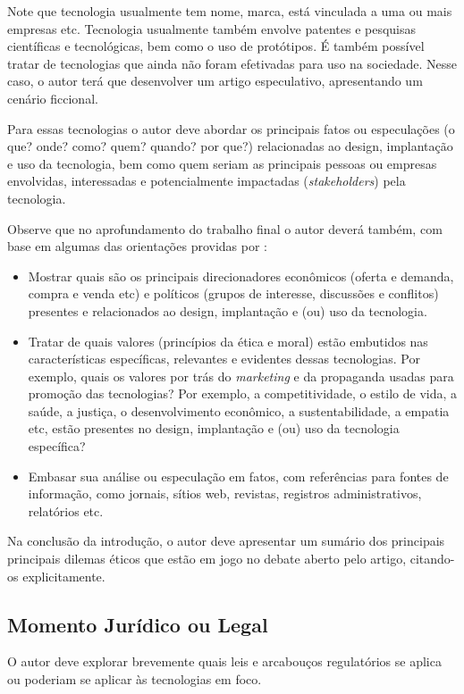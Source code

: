 \documentclass[12pt]{article}
\begin{document}
	Note que tecnologia usualmente tem nome, marca, está vinculada a uma ou mais empresas etc. Tecnologia usualmente também envolve patentes e pesquisas científicas e tecnológicas, bem como o uso de protótipos. É também possível tratar de tecnologias que ainda não foram efetivadas para uso na sociedade. Nesse caso, o autor terá que desenvolver um artigo especulativo, apresentando um cenário ficcional.

	Para essas tecnologias o autor deve abordar os principais fatos ou especulações (o que? onde? como? quem? quando? por que?) relacionadas ao design, implantação e uso da tecnologia, bem como quem seriam as principais pessoas ou empresas envolvidas, interessadas e potencialmente impactadas (\textit{stakeholders}) pela tecnologia.

	Observe que no aprofundamento do trabalho final o autor deverá também, com base em algumas das orientações providas por \citet{jones_doing_2016}:
	\begin{itemize}
		\item  Mostrar quais são os principais direcionadores econômicos (oferta e demanda, compra e venda etc) e políticos (grupos de interesse, discussões e conflitos) presentes e relacionados ao design, implantação e (ou) uso da tecnologia.

		\item  Tratar de quais valores (princípios da ética e moral) estão embutidos nas características específicas, relevantes e evidentes dessas tecnologias. Por exemplo, quais os valores por trás do \textit{marketing} e da propaganda usadas para promoção das tecnologias? Por exemplo, a competitividade, o estilo de vida, a saúde, a justiça, o desenvolvimento econômico, a sustentabilidade, a empatia etc, estão presentes no design, implantação e (ou) uso da tecnologia específica?

		\item  Embasar sua análise ou especulação em fatos, com referências para fontes de informação, como jornais, sítios web, revistas, registros administrativos, relatórios etc.
	\end{itemize}

	Na conclusão da introdução, o autor deve apresentar um sumário dos principais principais dilemas éticos que estão em jogo no debate aberto pelo artigo, citando-os explicitamente.

	\subsection{\label{legal}Momento Jurídico ou Legal}
	O autor deve explorar brevemente quais leis e arcabouços regulatórios se aplica ou poderiam se aplicar às tecnologias em foco.
\end{document}
